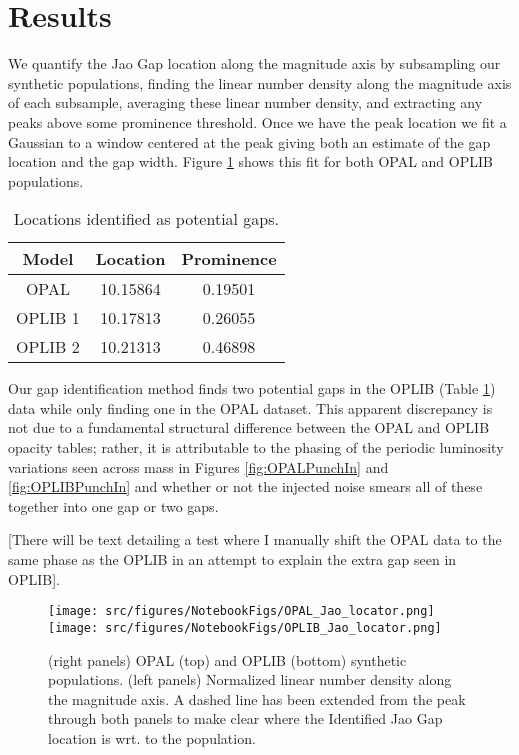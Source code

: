 \section{Results}\label{sec:results}
We quantify the Jao Gap location along the magnitude axis by subsampling
our synthetic populations, finding the linear number density along the
magnitude axis of each subsample, averaging these linear number density, and
extracting any peaks above some prominence threshold. Once we have the peak
location we fit a Gaussian to a window centered at the peak giving both an
estimate of the gap location and the gap width. Figure \ref{fig:JaoGapLocator}
shows this fit for both OPAL and OPLIB populations.

\begin{table}
	\centering
	\begin{tabular}{c | c c}
		\hline
		Model & Location & Prominence \\
		\hline
		\hline
		OPAL & 10.15864 & 0.19501 \\
		OPLIB 1 & 10.17813 & 0.26055 \\
		OPLIB 2 & 10.21313 & 0.46898
	\end{tabular}
	\caption{Locations identified as potential gaps.}
	\label{tab:GapLocation}
\end{table}

Our gap identification method finds two potential gaps in the OPLIB (Table
\ref{tab:GapLocation}) data while only finding one in the OPAL dataset. This
apparent discrepancy is not due to a fundamental structural difference between
the OPAL and OPLIB opacity tables; rather, it is attributable to the
phasing of the periodic luminosity variations seen across mass in Figures
\ref{fig:OPALPunchIn} and \ref{fig:OPLIBPunchIn} and whether or not the
injected noise smears all of these together into one gap or two gaps.

{\color{red} [There will be text detailing a test where I manually shift the
OPAL data to the same phase as the OPLIB in an attempt to explain the extra gap
seen in OPLIB]}.

\begin{figure}
	\centering
	\texttt{[image: src/figures/NotebookFigs/OPAL\_Jao\_locator.png]}
	\texttt{[image: src/figures/NotebookFigs/OPLIB\_Jao\_locator.png]}
	\caption{(right panels) OPAL (top) and OPLIB (bottom) synthetic
	populations. (left panels) Normalized linear number density along the
	magnitude axis. A dashed line has been extended from the peak through both
	panels to make clear where the Identified Jao Gap location is wrt. to the
	population. }
	\label{fig:JaoGapLocator}
\end{figure}

